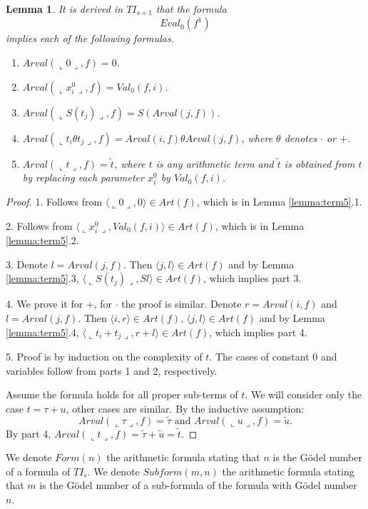 \documentclass{asl}
\newtheorem{lemma}{Lemma}[section]
\theoremstyle{definition}
\begin{document}
\begin{lemma}
It is derived in $TI_{s+1}$ that the formula 
\[Eval_0(f^1)\]
implies each of the following formulas.
\begin{enumerate}
\item
$Arval(\llcorner 0\lrcorner,f)=0$.
\medskip
\item $Arval(\llcorner x_i^0\lrcorner, f)=Val_0(f,i)$.
\medskip
\item
$Arval(\llcorner S(t_j)\lrcorner,f)=S(Arval(j,f))$.
\medskip
\item
$Arval(\llcorner t_i\theta t_j\lrcorner,f)=Arval(i,f)\theta Arval(j,f)$,
where $\theta$ denotes $\cdot$ or $+$.
\medskip
\item
$Arval(\llcorner t\lrcorner,f)=\tilde{t}$,
where $t$ is any arithmetic term and $\tilde{t}$ is obtained from $t$ by replacing each parameter $x_i^0$ by $Val_0(f,i)$.
\end{enumerate}
\label{lemma:term7}
\end{lemma}
\begin{proof}
1. Follows from $\langle \llcorner 0\lrcorner,0\rangle\in Art(f)$, which is in Lemma \ref{lemma:term5}.1.

2. Follows from $\langle \llcorner x_i^0\lrcorner,Val_0(f,i)\rangle\in Art(f)$, which is in Lemma \ref{lemma:term5}.2.

3. Denote $l=Arval(j,f)$. Then $\langle j,l\rangle\in Art(f)$ and by Lemma \ref{lemma:term5}.3, $\langle \llcorner S(t_j)\lrcorner,Sl\rangle\in Art(f)$, which implies part 3.

4. We prove it for +, for $\cdot$ the proof is similar. Denote $r=Arval(i,f)$ and $l=Arval(j,f)$. Then $\langle i,r\rangle\in Art(f)$, $\langle j,l\rangle\in Art(f)$ and by Lemma \ref{lemma:term5}.4, $\langle\llcorner t_i+ t_j\lrcorner,r+l\rangle\in Art(f)$, which implies part 4.

5. Proof is by induction on the complexity of $t$. The cases of constant 0 and variables follow from parts 1 and 2, respectively. 

Assume the formula holds for all proper sub-terms of $t$. We will consider only the case $t=\tau+ u$, other cases are similar. By the inductive assumption:
\[Arval(\llcorner \tau\lrcorner,f)=\tilde{\tau}\text{ and }Arval(\llcorner u\lrcorner,f)=\tilde{u}.\]
By part 4, $Arval(\llcorner t\lrcorner,f)=\tilde{\tau}+\tilde{u}=\tilde{t}$.
\end{proof}

We denote $Form(n)$ the arithmetic formula stating that $n$ is the G\"{o}del number of a formula of $TI_s$. We denote $Subform(m,n)$ the arithmetic formula stating that $m$ is the G\"{o}del number of a sub-formula of the formula with G\"{o}del number $n$. 
\end{document}
